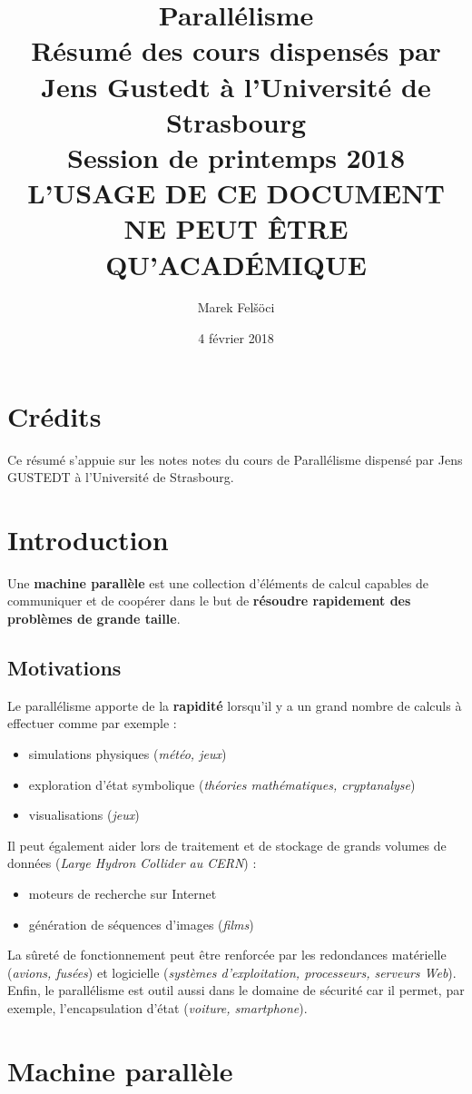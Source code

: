 \documentclass[12pt, a4paper]{article}
\title{
  \textbf{Parallélisme} \\
  \Large Résumé des cours dispensés par Jens Gustedt à l'Université de
  Strasbourg \\
  \large Session de printemps 2018 \\
  \huge L'USAGE DE CE DOCUMENT NE PEUT ÊTRE QU'ACADÉMIQUE
}
\author{Marek Felšöci}
\date{4 février 2018}
\begin{document}
  \maketitle
  \section*{Crédits}
    Ce résumé s'appuie sur les notes notes du cours de Parallélisme dispensé par
    Jens GUSTEDT à l'Université de Strasbourg.
  \section{Introduction}
    Une \textbf{machine parallèle} est une collection d'éléments de calcul
    capables de communiquer et de coopérer dans le but de \textbf{résoudre
    rapidement des problèmes de grande taille}.
    \subsection{Motivations}
      Le parallélisme apporte de la \textbf{rapidité} lorsqu'il y a un grand
      nombre de calculs à effectuer comme par exemple :
      \begin{itemize}
        \item simulations physiques (\textit{météo, jeux})
        \item exploration d'état symbolique (\textit{théories mathématiques,
        cryptanalyse})
        \item visualisations (\textit{jeux})
      \end{itemize}
      Il peut également aider lors de traitement et de stockage de grands
      volumes de données (\textit{Large Hydron Collider au CERN}) :
      \begin{itemize}
        \item moteurs de recherche sur Internet
        \item génération de séquences d'images (\textit{films})
      \end{itemize}
      La sûreté de fonctionnement peut être renforcée par les redondances
      matérielle (\textit{avions, fusées}) et logicielle (\textit{systèmes
      d'exploitation, processeurs, serveurs Web}). Enfin, le parallélisme est
      outil aussi dans le domaine de sécurité car il permet, par exemple,
      l'encapsulation d'état (\textit{voiture, smartphone}).
  \section{Machine parallèle}
\end{document}
